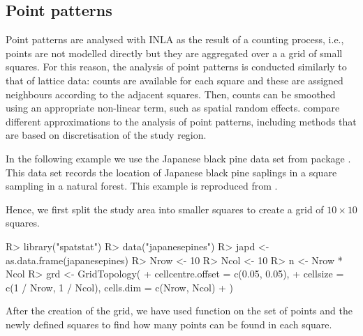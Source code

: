 \documentclass[article]{jss}
\begin{document}
\subsection{Point patterns}

Point patterns are analysed with INLA as the result of a counting process,
i.e., points are not modelled directly but they are aggregated over a a grid
of small squares. For this reason, the analysis of point patterns is conducted
similarly to that of lattice data: counts are available for each square and 
these are assigned neighbours according to the adjacent squares. Then, counts
can be smoothed using an appropriate non-linear term, such as spatial
random effects. \citet{HossainLawson:2009} compare different approximations
to the analysis of point patterns, including methods that are based on discretisation of the study region.

In the following example we use the Japanese black pine data set from
 package  \citep{spatstat:2005}. This data set records the location of
Japanese black pine saplings in a square sampling in a natural forest.  This
example is reproduced from \citet{GomezRubioetal:2013}.

Hence, we first split the study area into smaller squares to create a
grid of $10\times 10$ squares.

\begin{Schunk}
\begin{Sinput}
R> library("spatstat")
R> data("japanesepines")
R> japd <- as.data.frame(japanesepines)
R> Nrow <- 10
R> Ncol <- 10
R> n <- Nrow * Ncol
R> grd <- GridTopology(
+     cellcentre.offset = c(0.05, 0.05),
+     cellsize = c(1 / Nrow, 1 / Ncol), cells.dim = c(Nrow, Ncol)
+  )
\end{Sinput}
\end{Schunk}


After the creation of the grid, we have used function  on
the set of points and the newly defined squares to find how many points can be
found in each square.

\begin{Schunk}
\end{Schunk}
\end{document}
